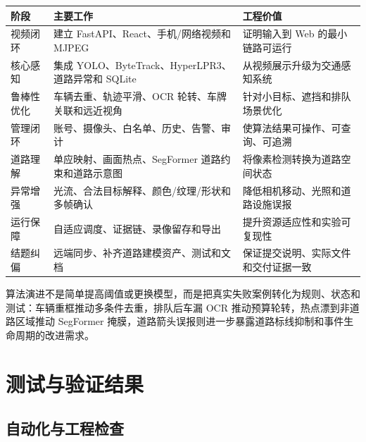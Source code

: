 \begin{longtable}[]{@{}
  >{\raggedright\arraybackslash}p{}
  >{\raggedright\arraybackslash}p{}
  >{\raggedright\arraybackslash}p{}@{}}
\toprule\noalign{}
\begin{minipage}[b]{\linewidth}\raggedright
阶段
\end{minipage} & \begin{minipage}[b]{\linewidth}\raggedright
主要工作
\end{minipage} & \begin{minipage}[b]{\linewidth}\raggedright
工程价值
\end{minipage} \\
\midrule\noalign{}
\endhead
\bottomrule\noalign{}
\endlastfoot
视频闭环 & 建立 FastAPI、React、手机/网络视频和 MJPEG & 证明输入到 Web 的最小链路可运行 \\
核心感知 & 集成 YOLO、ByteTrack、HyperLPR3、道路异常和 SQLite & 从视频展示升级为交通感知系统 \\
鲁棒性优化 & 车辆去重、轨迹平滑、OCR 轮转、车牌关联和远近视角 & 针对小目标、遮挡和排队场景优化 \\
管理闭环 & 账号、摄像头、白名单、历史、告警、审计 & 使算法结果可操作、可查询、可追溯 \\
道路理解 & 单应映射、画面热点、SegFormer 道路约束和道路示意图 & 将像素检测转换为道路空间状态 \\
异常增强 & 光流、合法目标解释、颜色/纹理/形状和多帧确认 & 降低相机移动、光照和道路设施误报 \\
运行保障 & 自适应调度、证据链、录像留存和导出 & 提升资源适应性和实验可复现性 \\
结题纠偏 & 远端同步、补齐道路建模资产、测试和文档 & 保证提交说明、实际文件和交付证据一致 \\
\end{longtable}

算法演进不是简单提高阈值或更换模型，而是把真实失败案例转化为规则、状态和测试：车辆重框推动多条件去重，排队后车漏 OCR 推动预算轮转，热点漂到非道路区域推动 SegFormer 掩膜，道路箭头误报则进一步暴露道路标线抑制和事件生命周期的改进需求。

\section{测试与验证结果}\label{summary-ux6d4bux8bd5ux4e0eux9a8cux8bc1ux7ed3ux679c}

\subsection{自动化与工程检查}\label{summary-ux81eaux52a8ux5316ux4e0eux5de5ux7a0bux68c0ux67e5}

